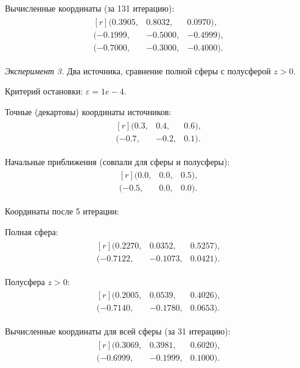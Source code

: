 Вычисленные координаты (за 131 итерацию):
\begin{align*}
    \begin{matrix*}[r]
    (0.3905, & 0.8032, & 0.0970) \text{,}\\
    (-0.1999, & -0.5000, & -0.4999) \text{,}\\
    (-0.7000, & -0.3000, & -0.4000) \text{.}
    \end{matrix*}
\end{align*}

\emph{Эксперимент 3.} Два источника, сравнение полной сферы с полусферой $z > 0$.

Критерий остановки: $\varepsilon = 1e-4$.

Точные (декартовы) координаты источников:
\begin{align*}
    \begin{matrix*}[r]
    (0.3, & 0.4, & 0.6) \text{,}\\
    (-0.7, & -0.2, & 0.1) \text{.}
    \end{matrix*}
\end{align*}

Начальные приближения (совпали для сферы и полусферы):
\begin{align*}
    \begin{matrix*}[r]
    (0.0, & 0.0, & 0.5) \text{,}\\
    (-0.5, & 0.0, & 0.0) \text{.}
    \end{matrix*}
\end{align*}

Координаты после 5 итерации:

Полная сфера:
\begin{align*}
    \begin{matrix*}[r]
    (0.2270, & 0.0352, & 0.5257) \text{,}\\
    (-0.7122, & -0.1073, & 0.0421) \text{.}
    \end{matrix*}
\end{align*}

Полусфера $z > 0$:
\begin{align*}
    \begin{matrix*}[r]
    (0.2005, & 0.0539, & 0.4026) \text{,}\\
    (-0.7140, & -0.1780, & 0.0653) \text{.}
    \end{matrix*}
\end{align*}

Вычисленные координаты для всей сферы (за 31 итерацию):
\begin{align*}
    \begin{matrix*}[r]
    (0.3069, & 0.3981, & 0.6020) \text{,}\\
    (-0.6999, & -0.1999, & 0.1000) \text{.}
    \end{matrix*}
\end{align*}

